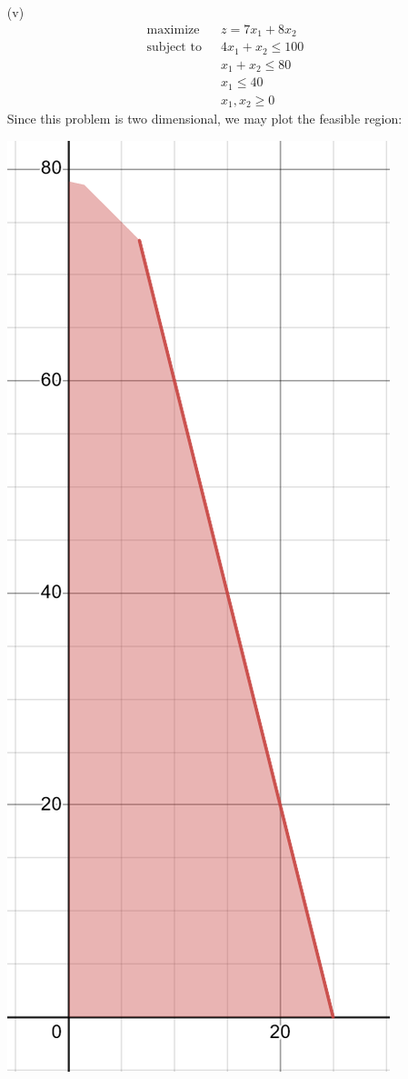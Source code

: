 \documentclass{article}
\begin{document}
\begin{itemize}
    \item[(v)]
    \begin{align*}
        \text{maximize} \:\:\:\: &z = 7x_1 + 8x_2\\
        \text{subject to} \:\:\: &4x_1 +x_2 \leq 100\\
        &x_1 + x_2 \leq 80\\
        &x_1 \leq 40\\
        &x_1,x_2\geq 0
    \end{align*}
    Since this problem is two dimensional, we may plot the feasible region: 
    \begin{center}
        \includegraphics[scale = 0.6]{2_2_v_plot}

\end{center}
\end{itemize}
\end{document}
